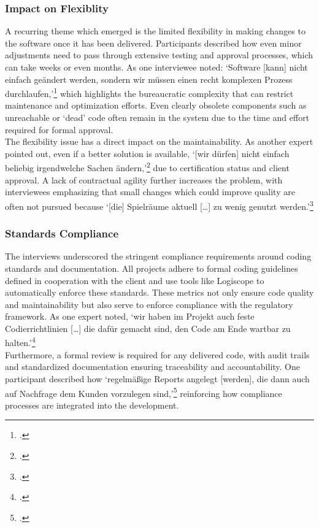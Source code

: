 \subsubsection{Impact on Flexiblity}
A recurring theme which emerged is the limited flexibility in making changes to the software once it has been delivered. Participants described how even minor adjustments need to pass through extensive testing and approval processes, which can take weeks or even months.
As one interviewee noted: `Software [kann] nicht einfach geändert werden, sondern wir müssen einen recht komplexen Prozess durchlaufen,'\footcite{interview2} which highlights the bureaucratic complexity that can restrict maintenance and optimization efforts. Even clearly obsolete components such as unreachable or `dead' code
often remain in the system due to the time and effort required for formal approval.\\

The flexibility issue has a direct impact on the maintainability. As another expert pointed out, even if a better solution is available, `[wir dürfen] nicht einfach beliebig irgendwelche Sachen ändern,'\footcite{interview3} due to certification status and client approval. A lack of contractual agility further increases the problem,
with interviewees emphasizing that small changes which could improve quality are often not pursued because `[die] Spielräume aktuell [\ldots] zu wenig genutzt werden.'\footcite{interview3}

\subsubsection{Standards Compliance}
The interviews underscored the stringent compliance requirements around coding standards and documentation. All projects adhere to formal coding guidelines defined in cooperation with the client and use tools like Logiscope to automatically enforce these standards.
These metrics not only ensure code quality and maintainability but also serve to enforce compliance with the regulatory framework. As one expert noted, `wir haben im Projekt auch feste Codierrichtlinien [\ldots] die dafür gemacht sind, den Code am Ende wartbar zu halten.'\footcite{interview2}\\
Furthermore, a formal review is required for any delivered code, with audit trails and standardized documentation ensuring traceability and accountability. One participant described how `regelmäßige Reports angelegt [werden], die dann auch auf Nachfrage dem Kunden vorzulegen sind,'\footcite{interview2} reinforcing how compliance processes are integrated into the development.

